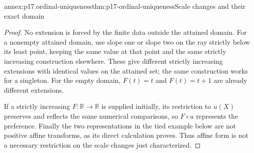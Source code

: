 \begin{annexitem}{annex:p17.ordinal-uniqueness}{thm:p17-ordinal-uniqueness}{Scale changes and their exact domain}
\begin{proof}
No extension is forced by the finite data outside the attained domain.
For a nonempty attained domain, use slope one or slope two on the ray
strictly below its least point, keeping the same value at that point and
the same strictly increasing construction elsewhere. These give different
strictly increasing extensions with identical values on the attained set;
the same construction works for a singleton. For the empty domain,
\(F(t)=t\) and \(F(t)=t+1\) are already different extensions.

If a strictly increasing \(F:\mathbb{R}\to\mathbb{R}\) is supplied initially,
its restriction to \(u(X)\) preserves and reflects the same numerical
comparisons, so \(F\circ u\) represents the preference. Finally the
two representations in the tied example below are not positive affine
transforms, as its direct calculation proves. Thus affine form is not
a necessary restriction on the scale changes just characterized.
\end{proof}
\end{annexitem}

